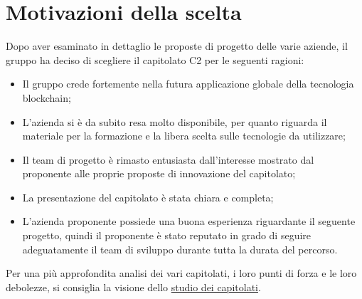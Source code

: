 \section{Motivazioni della scelta}\label{section:motivazioni}

Dopo aver esaminato in dettaglio le proposte di progetto delle varie aziende, il gruppo ha deciso di scegliere il capitolato C2 per le seguenti ragioni:
\begin{itemize}
    \item Il gruppo crede fortemente nella futura applicazione globale della tecnologia blockchain\glo{};
    \item L'azienda si è da subito resa molto disponibile, per quanto riguarda il materiale per la formazione e la libera scelta sulle tecnologie da utilizzare;
    \item Il team di progetto è rimasto entusiasta dall'interesse mostrato dal proponente alle proprie proposte di innovazione del capitolato;
    \item La presentazione del capitolato è stata chiara e completa;
    \item L'azienda proponente possiede una buona esperienza riguardante il seguente progetto, quindi il proponente è stato reputato in grado di seguire adeguatamente il team di sviluppo durante tutta la durata del percorso.
\end{itemize}
Per una più approfondita analisi dei vari capitolati, i loro punti di forza e le loro debolezze, 
si consiglia la visione dello \href{https://yakuzaishi-swe.github.io/docs/studio_capitolati.pdf}{studio dei capitolati}.